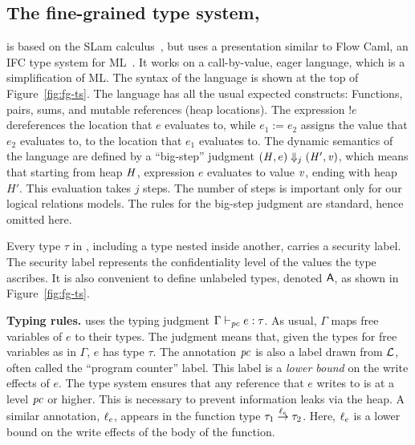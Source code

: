 \subsection{The fine-grained type system, {\fg}}
\label{sec:fg}




{\fg} is based on the SLam calculus~\cite{popl98-SLAM}, but uses a
presentation similar to Flow Caml, an IFC type system for
ML~\cite{toplas03-flowcaml}. It works on a call-by-value, eager
language, which is a simplification of ML. The syntax of the language
is shown at the top of Figure~\ref{fig:fg-ts}. The language has all
the usual expected constructs: Functions, pairs, sums, and mutable
references (heap locations). The expression ${!}e$ dereferences the
location that $e$ evaluates to, while ${e_1 := e_2}$ assigns the value
that $e_2$ evaluates to, to the location that $e_1$ evaluates to. The
dynamic semantics of the language are defined by a ``big-step''
judgment $(\mathit{H}, e) \Downarrow_{j} (\mathit{H}', \mathit{v})$, which means that
starting from heap $\mathit{H}$, expression $e$ evaluates to value $\mathit{v}$,
ending with heap $H'$. This evaluation takes $j$ steps. The number of
steps is important only for our logical relations models. The rules
for the big-step judgment are standard, hence omitted here.

Every type $\tau$ in {\fg}, including a type nested inside another,
carries a security label. The security label represents the
confidentiality level of the values the type ascribes. It is also
convenient to define unlabeled types, denoted $\mathsf{A}$, as shown in
Figure~\ref{fig:fg-ts}.

\medskip
\noindent\textbf{Typing rules.}  {\fg} uses the typing judgment
$\Gamma \vdash_{\mathit{pc}} e: \tau$. As usual, $\Gamma$ maps free variables of
$e$ to their types. The judgment means that, given the types for free
variables as in $\Gamma$, $e$ has type $\tau$. The annotation $\mathit{pc}$ is
also a label drawn from $\mathcal{L}$, often called the ``program
counter'' label. This label is a \emph{lower bound} on the write
effects of $e$. The type system ensures that any reference that $e$
writes to is at a level $\mathit{pc}$ or higher. This is necessary to prevent
information leaks via the heap. A similar annotation, $\ell_e$,
appears in the function type $\tau_1 \overset{\ell_e}\to \tau_2$. Here, $\ell_e$
is a lower bound on the write effects of the body of the function.

